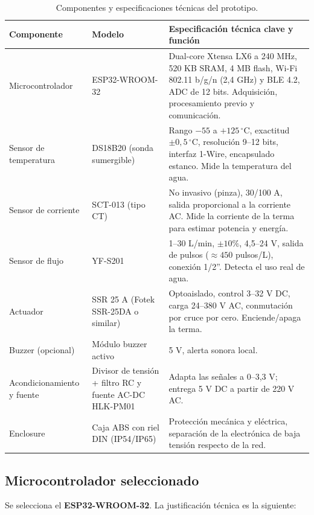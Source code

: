 \documentclass[11pt,a4paper]{article}
\newcommand{\tblhead}[1]{\textbf{\color{primary}#1}}
\begin{document}
\begin{table}[htbp]
\centering
\caption{Componentes y especificaciones técnicas del prototipo.}
\label{tab:componentes}
\footnotesize
\begin{tabularx}{\textwidth}{@{}P{3.0cm} P{2.8cm} L@{}}
\toprule
\tblhead{Componente} & \tblhead{Modelo} & \tblhead{Especificación técnica clave y función} \\
\midrule
Microcontrolador & ESP32-WROOM-32 & Dual-core Xtensa LX6 a 240 MHz, 520 KB SRAM, 4 MB flash, Wi-Fi 802.11 b/g/n (2,4 GHz) y BLE 4.2, ADC de 12 bits. Adquisición, procesamiento previo y comunicación. \\
Sensor de temperatura & DS18B20 (sonda sumergible) & Rango $-55$ a $+125\,^{\circ}\mathrm{C}$, exactitud $\pm 0{,}5\,^{\circ}\mathrm{C}$, resolución 9--12 bits, interfaz 1-Wire, encapsulado estanco. Mide la temperatura del agua. \\
Sensor de corriente & SCT-013 (tipo CT) & No invasivo (pinza), 30/100 A, salida proporcional a la corriente AC. Mide la corriente de la terma para estimar potencia y energía. \\
Sensor de flujo & YF-S201 & 1--30 L/min, $\pm 10\%$, 4,5--24 V, salida de pulsos ($\approx 450$ pulsos/L), conexión 1/2''. Detecta el uso real de agua. \\
Actuador & SSR 25 A (Fotek SSR-25DA o similar) & Optoaislado, control 3--32 V DC, carga 24--380 V AC, conmutación por cruce por cero. Enciende/apaga la terma. \\
Buzzer (opcional) & Módulo buzzer activo & 5 V, alerta sonora local. \\
Acondicionamiento y fuente & Divisor de tensión + filtro RC y fuente AC-DC HLK-PM01 & Adapta las señales a 0--3,3 V; entrega 5 V DC a partir de 220 V AC. \\
Enclosure & Caja ABS con riel DIN (IP54/IP65) & Protección mecánica y eléctrica, separación de la electrónica de baja tensión respecto de la red. \\
\bottomrule
\end{tabularx}
\end{table}

\subsection{Microcontrolador seleccionado}
Se selecciona el \textbf{ESP32-WROOM-32}. La justificación técnica es la siguiente:
\end{document}
